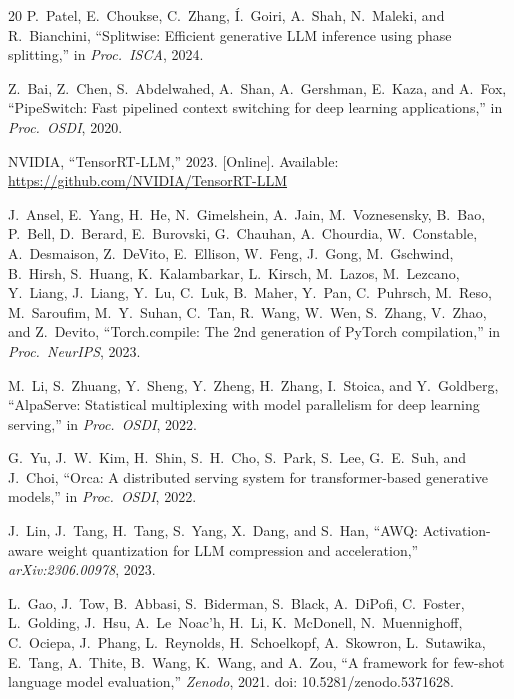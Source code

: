 \documentclass[lettersize,journal]{IEEEtran}
\begin{document}
{\begin{thebibliography}{20}
P.~Patel, E.~Choukse, C.~Zhang, \'I.~Goiri, A.~Shah, N.~Maleki, and
R.~Bianchini,
``Splitwise: Efficient generative LLM inference using phase splitting,''
in \textit{Proc.\ ISCA}, 2024.

Z.~Bai, Z.~Chen, S.~Abdelwahed, A.~Shan, A.~Gershman, E.~Kaza,
and A.~Fox,
``PipeSwitch: Fast pipelined context switching for deep learning applications,''
in \textit{Proc.\ OSDI}, 2020.

NVIDIA,
``TensorRT-LLM,'' 2023. [Online]. Available:
\url{https://github.com/NVIDIA/TensorRT-LLM}

J.~Ansel, E.~Yang, H.~He, N.~Gimelshein, A.~Jain, M.~Voznesensky,
B.~Bao, P.~Bell, D.~Berard, E.~Burovski, G.~Chauhan, A.~Chourdia,
W.~Constable, A.~Desmaison, Z.~DeVito, E.~Ellison, W.~Feng, J.~Gong,
M.~Gschwind, B.~Hirsh, S.~Huang, K.~Kalambarkar, L.~Kirsch, M.~Lazos,
M.~Lezcano, Y.~Liang, J.~Liang, Y.~Lu, C.~Luk, B.~Maher, Y.~Pan,
C.~Puhrsch, M.~Reso, M.~Saroufim, M.~Y.~Suhan, C.~Tan, R.~Wang,
W.~Wen, S.~Zhang, V.~Zhao, and Z.~Devito,
``Torch.compile: The 2nd generation of PyTorch compilation,''
in \textit{Proc.\ NeurIPS}, 2023.

M.~Li, S.~Zhuang, Y.~Sheng, Y.~Zheng, H.~Zhang, I.~Stoica,
and Y.~Goldberg,
``AlpaServe: Statistical multiplexing with model parallelism for deep learning serving,''
in \textit{Proc.\ OSDI}, 2022.

G.~Yu, J.~W.~Kim, H.~Shin, S.~H.~Cho, S.~Park, S.~Lee, G.~E.~Suh,
and J.~Choi,
``Orca: A distributed serving system for transformer-based generative models,''
in \textit{Proc.\ OSDI}, 2022.

J.~Lin, J.~Tang, H.~Tang, S.~Yang, X.~Dang, and S.~Han,
``AWQ: Activation-aware weight quantization for LLM compression and acceleration,''
\textit{arXiv:2306.00978}, 2023.

L.~Gao, J.~Tow, B.~Abbasi, S.~Biderman, S.~Black, A.~DiPofi,
C.~Foster, L.~Golding, J.~Hsu, A.~Le~Noac'h, H.~Li, K.~McDonell,
N.~Muennighoff, C.~Ociepa, J.~Phang, L.~Reynolds, H.~Schoelkopf,
A.~Skowron, L.~Sutawika, E.~Tang, A.~Thite, B.~Wang, K.~Wang,
and A.~Zou,
``A framework for few-shot language model evaluation,''
\textit{Zenodo}, 2021. doi: 10.5281/zenodo.5371628.

\end{thebibliography}
} %

\vfill
\end{document}
